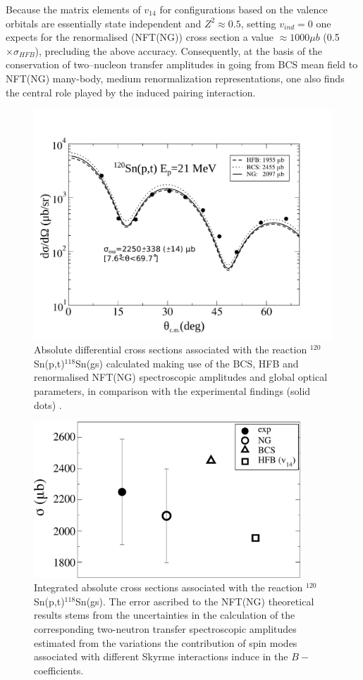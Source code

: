 Because the matrix elements of $v_{14}$ for configurations based  on the valence orbitals are essentially state independent and
$Z^2 \approx 0.5$, setting $v_{ind} = 0$ one expects for the renormalised (NFT(NG)) cross section a value 
$\approx 1000 \mu b$ (0.5 $\times \sigma_{HFB}$), precluding the above accuracy. Consequently, at the basis 
of the  conservation of two--nucleon transfer  amplitudes in going 
from BCS mean field to NFT(NG) many-body, medium renormalization representations, one also finds the central role  played by the induced pairing
interaction.
  \begin{figure}
  \centerline{\includegraphics*[width=12cm,angle=0]{C8/figsC8/Fig2}}
  	\caption{Absolute differential  cross sections associated with the reaction
  	$^{120}$Sn(p,t)$^{118}$Sn(gs) calculated making use of the BCS, HFB and renormalised NFT(NG) spectroscopic 
  	amplitudes and global optical parameters, in comparison with the experimental findings (solid dots) \cite{Guazzoni:08}.}\label{fig6.4.2}
  \end{figure}
  \begin{figure}
  \centerline{\includegraphics*[width=10cm,angle=0]{C8/figsC8/fig5}}
  	\caption{Integrated absolute  cross sections associated with the reaction
  	$^{120}$Sn(p,t)$^{118}$Sn(gs). The error ascribed  to
  	the NFT(NG) theoretical results stems from  the uncertainties in the calculation of the  corresponding
  	two-neutron transfer  spectroscopic amplitudes estimated from the 
  	variations the contribution of  spin modes associated with  different  Skyrme interactions induce in the 
  	$B-$coefficients.}\label{fig6.4.3}
  \end{figure}
  
